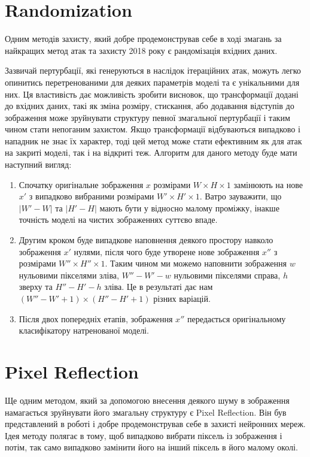 \documentclass[a4paper,14pt]{extreport}
\begin{document}
	\section{Randomization}
	Одним методів захисту, який добре продемонстрував себе в ході змагань за найкращих метод атак та захисту 2018 року \cite{kurakin2018adversarial} є рандомізація вхідних даних.
	
	Зазвичай пертурбації, які генеруються в наслідок ітераційних атак, можуть легко опинитись перетренованими для деяких параметрів моделі та є унікальними для них. Ця властивість дає можливість зробити висновок, що трансформації додані до вхідних даних, такі як зміна розміру, стискання, або додавання відступів до зображення може зруйнувати структуру певної змагальної пертурбації і таким чином стати непоганим захистом. Якщо трансформації відбуваються випадково і нападник не знає їх характер, тоді цей метод може стати ефективним як для атак на закриті моделі, так і на відкриті теж.
	Алгоритм для даного методу буде мати наступний вигляд:
	
	\begin{enumerate}
	\item Спочатку оригінальне зображення $x$ розмірами $W \times H \times 1$ замінюють на нове $x'$ з випадково вибраними розмірами $W' \times H' \times 1$. Ватро зауважити, що $|W' - W|$ та $|H' - H|$ мають бути у відносно малому проміжку, інакше точність моделі на чистих зображеннях суттєво впаде.
	\item Другим кроком буде випадкове наповнення деякого простору навколо зображення $x'$ нулями, після чого буде утворене нове зображення $x''$ з розмірами $W'' \times H'' \times 1$. Таким чином ми можемо наповнити зображення $w$ нульовими пікселями зліва, $W'' - W' - w$ нульовими пікселями справа, $h$ зверху та $H'' - H' - h$ зліва. Це в результаті дає нам  $(W''-W'+1) \times (H''- H'+1)$ різних варіацій.
	\item Після двох попередніх етапів, зображення $x''$ передається оригінальному класифікатору натренованої моделі.
	\end{enumerate}

	\section{Pixel Reflection}
	Ще одним методом, який за допомогою внесення деякого шуму в зображення намагається зруйнувати його змагальну структуру є Pixel Reflection. Він був представлений в роботі \textcite{prakash2018deflecting} і добре продемонстрував себе в захисті нейронних мереж. Ідея методу полягає в тому, щоб випадково вибрати піксель із зображення і потім, так само випадково замінити його на інший піксель в його малому околі. 
	
\end{document}
